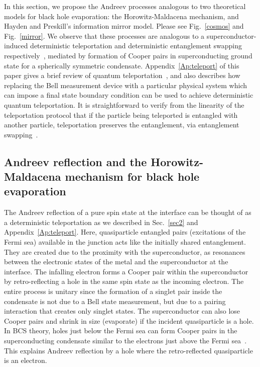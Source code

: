 \documentclass[12pt,letterpaper,aps,onecolumn,superscriptaddress,floatfix,notitlepage]{revtex4-1}
\begin{document}
	In this section, we propose the Andreev processes analogous to two theoretical models for black hole evaporation: the Horowitz-Maldacena mechanism, and Hayden and Preskill's information mirror model. Please see Fig.~\ref{cosmos} and Fig.~\ref{mirror}.       
	We observe that these processes are analogous to a superconductor-induced deterministic teleportation and deterministic entanglement swapping respectively~\cite{projection,niels,bennett1993teleporting,zukowski1993event}, mediated by formation of Cooper pairs in superconducting ground state for a spherically symmetric condensate. Appendix~\ref{Ap:teleport} of this paper gives a brief review of quantum teleportation~\cite{bennett1993teleporting}, and also describes how replacing the Bell measurement device with a particular physical system which can impose a final state boundary condition can be used to achieve deterministic quantum teleportation. It is straightforward to verify from the linearity of the teleportation protocol that if the particle being teleported is entangled with another particle, teleportation preserves the entanglement, via entanglement swapping~\cite{niels,zukowski1993event}.
	\subsection{Andreev reflection and the Horowitz-Maldacena mechanism for black hole evaporation}
	
	The Andreev reflection of a pure spin state at the interface can be thought of as a deterministic teleportation as we described in Sec.~\ref{sec2} and Appendix~\ref{Ap:teleport}.  Here, quasiparticle entangled pairs (excitations of the Fermi sea) available in the junction acts like the initially shared entanglement. They are created due to the proximity with the superconductor, as resonances between the electronic states of the metal and the superconductor at the interface.  The infalling electron forms a Cooper pair within the superconductor by retro-reflecting a hole in the same spin state as the incoming electron. The entire process is unitary since the formation of a singlet pair inside the condensate is not due to a Bell state measurement, but due to a pairing interaction that creates only singlet states. The superconductor can also lose Cooper pairs and shrink in size (evaporate) if the incident quasiparticle is a hole. In BCS theory, holes just below the Fermi sea can form Cooper pairs in the superconducting condensate similar to the electrons just above the Fermi sea~\cite{annett2004superconductivity}. This explains Andreev reflection by a hole where the retro-reflected quasiparticle is an electron.     
	
\end{document}
